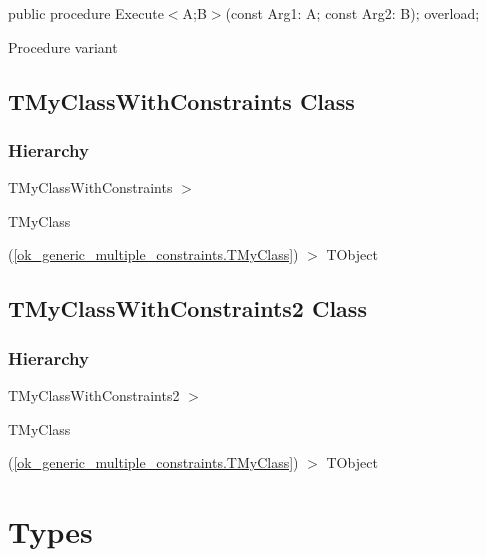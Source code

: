 \documentclass{report}
\begin{document}
\begin{list}{}{
\setlength{\itemindent}{0cm}
\setlength{\listparindent}{0cm}
\setlength{\leftmargin}{\evensidemargin}
\addtolength{\leftmargin}{\tmplength}
\settowidth{\labelsep}{X}
\addtolength{\leftmargin}{\labelsep}
\setlength{\labelwidth}{\tmplength}
}
\begin{flushleft}
\item[\textbf{Declaration}\hfill]
\begin{ttfamily}
public procedure Execute{$<$}A;B{$>$}(const Arg1: A; const Arg2: B); overload;\end{ttfamily}


\end{flushleft}
\par
\item[\textbf{Description}]
Procedure variant

\end{list}
\subsection*{TMyClassWithConstraints Class}
\subsubsection*{\large{\textbf{Hierarchy}}\normalsize\hspace{1ex}\hfill}
TMyClassWithConstraints {$>$} \begin{ttfamily}TMyClass\end{ttfamily}(\ref{ok_generic_multiple_constraints.TMyClass}) {$>$} 
TObject
\subsection*{TMyClassWithConstraints2 Class}
\subsubsection*{\large{\textbf{Hierarchy}}\normalsize\hspace{1ex}\hfill}
TMyClassWithConstraints2 {$>$} \begin{ttfamily}TMyClass\end{ttfamily}(\ref{ok_generic_multiple_constraints.TMyClass}) {$>$} 
TObject
\section{Types}
\end{document}
